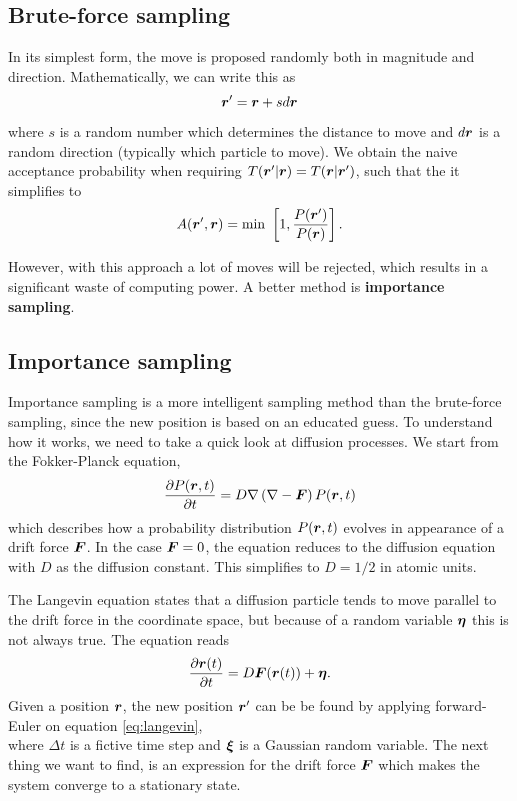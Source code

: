 \subsection{Brute-force sampling}
In its simplest form, the move is proposed randomly both in magnitude and direction. Mathematically, we can write this as
\begin{equation}
\boldsymbol{{r}}'=\boldsymbol{{r}}+sd\boldsymbol{{r}}
\end{equation}
where $s$ is a random number which determines the distance to move and $d\boldsymbol{{r}}$ is a random direction (typically which particle to move). We obtain the naive acceptance probability when requiring $T(\boldsymbol{{r}}'|\boldsymbol{{r}})=T(\boldsymbol{{r}}|\boldsymbol{{r}}')$, such that the it simplifies to
\begin{equation}
A(\boldsymbol{{r}}',\boldsymbol{{r}})=\text{min }\left[1,\frac{P(\boldsymbol{{r}}')}{P(\boldsymbol{{r}})}\right].
\end{equation}

However, with this approach a lot of moves will be rejected, which results in a significant waste of computing power. A better method is \textbf{importance sampling}.

\subsection{Importance sampling}
Importance sampling is a more intelligent sampling method than the brute-force sampling, since the new position is based on an educated guess. To understand how it works, we need to take a quick look at diffusion processes. We start from the Fokker-Planck equation,
\begin{equation}
\frac{\partial P(\boldsymbol{{r}},t)}{\partial t}=D\nabla\left(\nabla-\boldsymbol{{F}}\right)P(\boldsymbol{{r}},t)
\end{equation}
which describes how a probability distribution $P(\boldsymbol{{r}},t)$ evolves in appearance of a drift force $\boldsymbol{{F}}$. In the case $\boldsymbol{{F}}=0$, the equation reduces to the diffusion equation with $D$ as the diffusion constant. This simplifies to $D=1/2$ in atomic units. 

The Langevin equation states that a diffusion particle tends to move parallel to the drift force in the coordinate space, but because of a random variable $\boldsymbol{{\eta}}$ this is not always true. The equation reads
\begin{equation}
\frac{\partial \boldsymbol{{r}}(t)}{\partial t}=D\boldsymbol{{F}}(\boldsymbol{{r}}(t))+\boldsymbol{{\eta}}.
\label{eq:langevin}
\end{equation}
Given a position $\boldsymbol{{r}}$, the new position $\boldsymbol{{r}}'$ can be be found by applying forward-Euler on equation \eqref{eq:langevin},
\begin{equation}
\end{equation}
where $\Delta t$ is a fictive time step and $\boldsymbol{{\xi}}$ is a Gaussian random variable. The next thing we want to find, is an expression for the drift force $\boldsymbol{{F}}$ which makes the system converge to a stationary state. 

